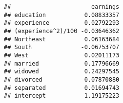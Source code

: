 \documentclass[
]{article}
\begin{document}
\begin{verbatim}
##                       earnings
## education           0.08833357
## experience          0.02792293
## (experience^2)/100 -0.03646362
## Northeast           0.06163684
## South              -0.06753707
## West                0.02011173
## married             0.17796669
## widowed             0.24297545
## divorced            0.07870880
## separated           0.01694743
## intercept           1.19175223
\end{verbatim}
\end{document}
